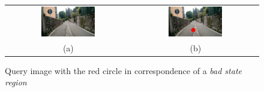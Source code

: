 \begin{figure}[t]
\centering
\begin{tabular}{cc}
\includegraphics[width=0.45\textwidth]{./img/ch-further/1461225656475_MEP_IMAGE}&
\includegraphics[width=0.45\textwidth]{./img/ch-further/1461225656475_MEP_IMAGE_with_mark}\\
(a)&(b)\\
\end{tabular}
\caption{Query image with the red circle in correspondence of a \emph{bad state region}}
\label{fig:mep_project}
\end{figure}

